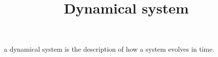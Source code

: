 \documentclass[a4paper]{article}
\title{Dynamical system}
\date{}
\begin{document}
\maketitle
    a dynamical system is the description of how a system evolves in time.
    
\end{document}
